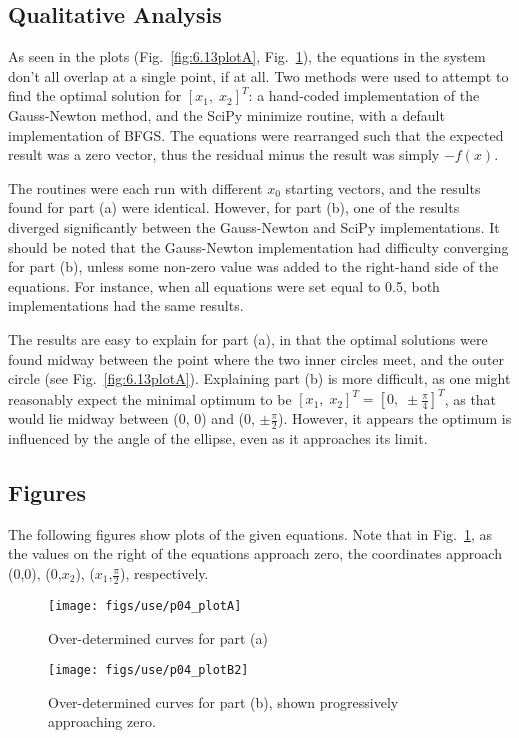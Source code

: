 \documentclass[paper=a4, fontsize=11pt]{scrartcl}
\numberwithin{equation}{section}		%
\numberwithin{figure}{section}			%
\numberwithin{table}{section}				%
\begin{document}
\subsection{Qualitative Analysis}
\par As seen in the plots (Fig.~\ref{fig:6.13plotA}, Fig.~\ref{fig:6.13plotB}), the equations in the system don't all overlap at a single point, if at all. Two methods were used to attempt to find the optimal solution for $[x_1, \; x_2]^T$: a hand-coded implementation of the Gauss-Newton method, and the SciPy minimize routine, with a default implementation of BFGS. The equations were rearranged such that the expected result was a zero vector, thus the residual minus the result was simply $-f(x)$. \\
\par The routines were each run with different $x_0$ starting vectors, and the results found for part (a) were identical. However, for part (b), one of the results diverged significantly between the Gauss-Newton and SciPy implementations. It should be noted that the Gauss-Newton implementation had difficulty converging for part (b), unless some non-zero value was added to the right-hand side of the equations. For instance, when all equations were set equal to 0.5, both implementations had the same results. \\
\par The results are easy to explain for part (a), in that the optimal solutions were found midway between the point where the two inner circles meet, and the outer circle (see Fig.~\ref{fig:6.13plotA}). Explaining part (b) is more difficult, as one might reasonably expect the minimal optimum to be $[x_1, \; x_2]^T = [0, \; \pm \frac{\pi}{4}]^T$, as that would lie midway between (0, 0) and (0, $\pm \frac{\pi}{2}$). However, it appears the optimum is influenced by the angle of the ellipse, even as it approaches its limit. \\


\vspace{4mm}
\subsection{Figures}
\par The following figures show plots of the given equations. Note that in Fig.~\ref{fig:6.13plotB}, as the values on the right of the equations approach zero, the coordinates approach (0,0), (0,$x_2$), ($x_1$,$\frac{\pi}{2}$), respectively. \\
\begin{figure}[!hbt]
		\texttt{[image: figs/use/p04\_plotA]}
		\caption{Over-determined curves for part (a)}
		\label{fig:6.13plotA}
	\endminipage\hfill
		\texttt{[image: figs/use/p04\_plotB2]}
		\caption{Over-determined curves for part (b), shown progressively approaching zero.}
		\label{fig:6.13plotB}
	\endminipage\hfill
\end{figure}
\end{document}
